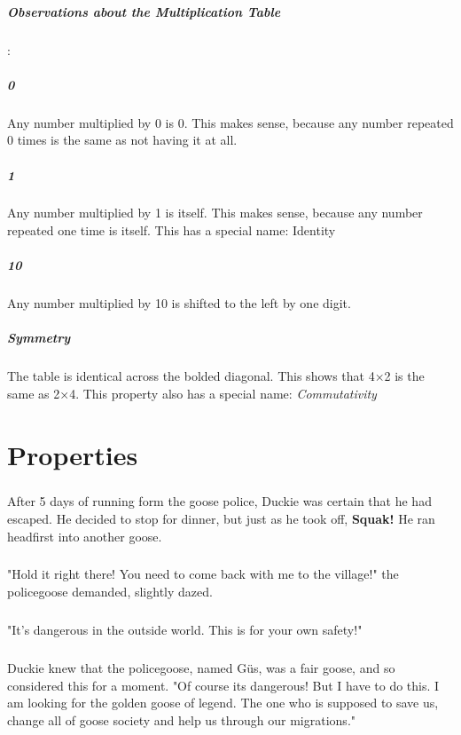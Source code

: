 \documentclass[a4paper,11pt ]{book}
\begin{document}
\paragraph{Observations about the Multiplication Table}:
\linebreak
\paragraph{0} Any number multiplied by 0 is 0. This makes sense, because any number
repeated 0 times is the same as not having it at all.
\paragraph{1} Any number multiplied by 1 is itself. This makes sense, because any
number repeated one time is itself. This has a special name: Identity
\paragraph{10} Any number multiplied by 10 is shifted to the left by one digit.
\paragraph{Symmetry} The table is identical across the bolded diagonal. This shows
that 4×2 is the same as 2×4. This property also has a special name:
\textit{Commutativity}
\chapter{Properties}
\paragraph{} After 5 days of running form the goose police, Duckie was certain that he had escaped. He decided to stop for dinner, but just as he took off, \textbf{Squak!} He ran headfirst into another goose. 
\paragraph{} "Hold it right there! You need to come back with me to the village!" the policegoose demanded, slightly dazed. 
\paragraph{} "It's dangerous in the outside world. This is for your own safety!"
\paragraph{} Duckie knew that the policegoose, named Güs, was a fair goose, and so considered this for a moment. "Of course its dangerous! But I have to do this. I am looking for the golden goose of legend. The one who is supposed to save us, change all of goose society and help us through our migrations."
\end{document}
